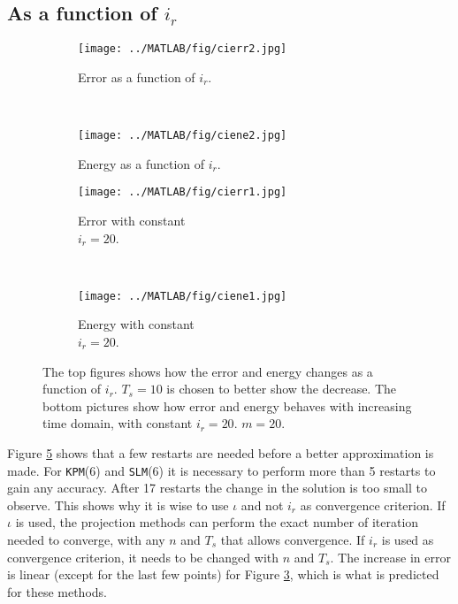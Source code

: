 \subsection{ As a function of $i_r$} %
\begin{figure}[H]
        \centering
        \begin{subfigure}[b]{0.3\textwidth}
                \texttt{[image: ../MATLAB/fig/cierr2.jpg]}
                \caption{ Error as a function of $i_r$. }
                \label{fig:cierr2}
        \end{subfigure}
        ~
		\begin{subfigure}[b]{0.3\textwidth}
                \texttt{[image: ../MATLAB/fig/ciene2.jpg]}
                \caption{ Energy as a function of $i_r$. }
                \label{fig:ciene2}
        \end{subfigure}    

        \begin{subfigure}[b]{0.3\textwidth}
                \texttt{[image: ../MATLAB/fig/cierr1.jpg]}
                \caption{ Error with constant \\ $i_r = 20$. }
                \label{fig:cierr1}
        \end{subfigure}
        ~
		\begin{subfigure}[b]{0.3\textwidth}
                \texttt{[image: ../MATLAB/fig/ciene1.jpg]}
                \caption{ Energy with constant \\ $i_r = 20$. }
                \label{fig:ciene1}
        \end{subfigure}
        \caption{ The top figures shows how the error and energy changes as a function of $i_r$. $T_s = 10$ is chosen to better show the decrease. The bottom pictures show how error and energy behaves with increasing time domain, with constant $i_r = 20$. $m = 20$. }
        \label{fig:ci}
\end{figure}
\noindent Figure \ref{fig:ci} shows that a few restarts are needed before a better approximation is made. For \texttt{KPM}(6) and \texttt{SLM}(6) it is necessary to perform more than 5 restarts to gain any accuracy. After 17 restarts the change in the solution is too small to observe. This shows why it is wise to use $\iota$ and not $i_r$ as convergence criterion. If $\iota$ is used, the projection methods can perform the exact number of iteration needed to converge, with any $n$ and $T_s$ that allows convergence. If $i_r$ is used as convergence criterion, it needs to be changed with $n$ and $T_s$.
The increase in error is linear (except for the last few points) for Figure \ref{fig:cierr1}, which is what is predicted for these methods. \\


